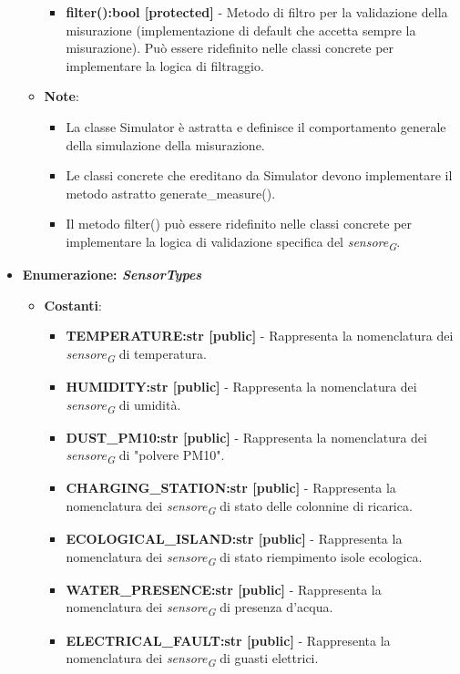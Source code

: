 \begin{itemize}
\begin{itemize}
\begin{itemize}
                \item \textbf{filter():bool [protected]} - Metodo di filtro per la validazione della misurazione (implementazione di default che accetta sempre la misurazione). Può essere ridefinito nelle classi concrete per implementare la logica di filtraggio.
            \end{itemize}
            \item \textbf{Note}:
            \begin{itemize}
                \item La classe Simulator è astratta e definisce il comportamento generale della simulazione della misurazione.
                \item Le classi concrete che ereditano da Simulator devono implementare il metodo astratto generate\_measure().
                \item Il metodo filter() può essere ridefinito nelle classi concrete per implementare la logica di validazione specifica del \textit{sensore}\textsubscript{\textit{G}}.
            \end{itemize}
        \end{itemize}
        
        
        
        
        \item{\textbf{Enumerazione: \textit{SensorTypes}}}
        \begin{itemize}
            \item \textbf{Costanti}: 
            \begin{itemize}
                \item \textbf{TEMPERATURE:str [public]} - Rappresenta la nomenclatura dei \textit{sensore}\textsubscript{\textit{G}} di temperatura.
                \item \textbf{HUMIDITY:str [public]} - Rappresenta la nomenclatura dei \textit{sensore}\textsubscript{\textit{G}} di umidità.
                \item \textbf{DUST\_PM10:str [public]} - Rappresenta la nomenclatura dei \textit{sensore}\textsubscript{\textit{G}} di "polvere PM10".
                \item \textbf{CHARGING\_STATION:str [public]} - Rappresenta la nomenclatura dei \textit{sensore}\textsubscript{\textit{G}} di stato delle colonnine di ricarica.
                \item \textbf{ECOLOGICAL\_ISLAND:str [public]} - Rappresenta la nomenclatura dei \textit{sensore}\textsubscript{\textit{G}} di stato riempimento isole ecologica.
                \item \textbf{WATER\_PRESENCE:str [public]} - Rappresenta la nomenclatura dei \textit{sensore}\textsubscript{\textit{G}} di presenza d'acqua.
                \item \textbf{ELECTRICAL\_FAULT:str [public]} - Rappresenta la nomenclatura dei \textit{sensore}\textsubscript{\textit{G}} di guasti elettrici.
            \end{itemize}


\end{itemize}
\end{itemize}
